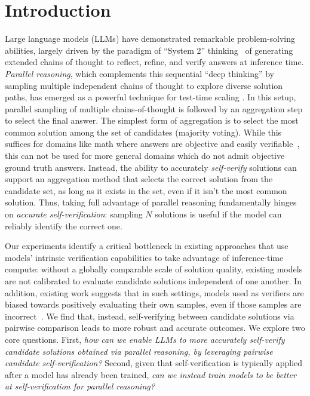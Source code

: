 
\section{Introduction}

Large language models (LLMs) have demonstrated remarkable problem-solving abilities, largely driven by the paradigm of ``System 2'' thinking~\citep{o1,openaio3,deepseekai2025deepseekr1incentivizingreasoningcapability} of generating extended chains of thought to reflect, refine, and verify answers at inference time.
\textit{Parallel reasoning}, which complements this sequential ``deep thinking'' by sampling multiple independent chains of thought to explore diverse solution paths, has emerged as a powerful technique for test-time scaling \citep{wang2023selfconsistency, DBLP:journals/corr/abs-2110-14168, pan2025learning, lian2025threadweaveradaptivethreadingefficient, snell2024scalingllmtesttimecompute}. In this setup, parallel sampling of multiple chains-of-thought is followed by an aggregation step to select the final answer.
The simplest form of aggregation is to select the most common solution among the set of candidates (majority voting).
While this suffices for domains like math where answers are objective and easily verifiable~\citep{wang2023selfconsistency}, this can not be used for more general domains which do not admit objective ground truth answers.
Instead, the ability to accurately \textit{self-verify} solutions can support an aggregation method that selects the correct solution from the candidate set, as long as it exists in the set, even if it isn't the most common solution. Thus, taking full advantage of parallel reasoning fundamentally hinges on \textit{accurate self-verification}: sampling $N$ solutions is useful if the model can reliably identify the correct one.


Our experiments identify a critical bottleneck in existing approaches that use models' intrinsic verification capabilities to take advantage of inference-time compute: without a globally comparable scale of solution quality, existing models are not calibrated to evaluate candidate solutions independent of one another.
In addition, existing work suggests that in such settings, models used as verifiers are biased towards positively evaluating their own samples, even if those samples are incorrect~\citep{lu2025doesverificationpayoff}.
We find that, instead, self-verifying between candidate solutions via pairwise comparison leads to more robust and accurate outcomes.
We explore two core questions.
First, \textit{how can we enable LLMs to more accurately self-verify candidate solutions obtained via parallel reasoning, by leveraging pairwise candidate self-verification?}
Second, given that self-verification is typically applied after a model has already been trained, \textit{can we instead train models to be better at self-verification for parallel reasoning?}

